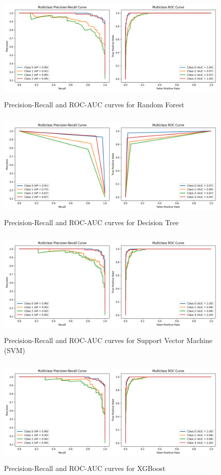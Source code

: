 \documentclass[12pt]{report}
\begin{document}
\begin{figure}[H]
    \centering
    \includegraphics[height=14em]{ra_pr_RF.png}
    \caption{Precision-Recall and ROC-AUC curves for Random Forest}
    \label{ra_pr_RF}
\end{figure}

\begin{figure}[H]
    \centering
    \includegraphics[height=14em]{ra_pr_DT.png}
    \caption{Precision-Recall and ROC-AUC curves for Decision Tree}
    \label{ra_pr_DT}
\end{figure}

\begin{figure}[H]
    \centering
    \includegraphics[height=14em]{ra_pr_SVM.png}
    \caption{Precision-Recall and ROC-AUC curves for Support Vector Machine (SVM)}
    \label{ra_pr_SVM}
\end{figure}

\begin{figure}[H]
    \centering
    \includegraphics[height=14em]{ra_pr_XG.png}
    \caption{Precision-Recall and ROC-AUC curves for XGBoost}
    \label{ra_pr_XG}
\end{figure}
\end{document}
